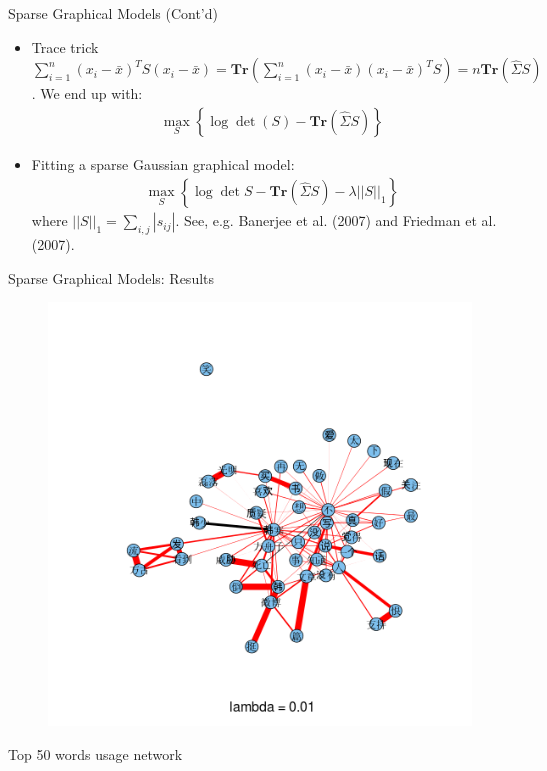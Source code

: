 \documentclass[12pt]{beamer}
\newcommand{\1}[1]{{\mathbf 1}\left\{#1\right\}}        %
\def\lp{\left(}
\def\rp{\right)}
\begin{document}
\begin{frame}[fragile]{Sparse Graphical Models (Cont'd)}

\begin{itemize}[<+->]
\item  Trace trick $\sum_{i=1}^n(x_i-\bar{x})^T S (x_i-\bar{x}) = \textbf{Tr} (\sum_{i=1}^n (x_i-\bar{x})(x_i-\bar{x})^TS) = n\textbf{Tr}(\hat{\Sigma}S)$. We end up with:
\begin{align*}
\max_S \left\{  \log \det \lp S\rp - \textbf{Tr}(\hat{\Sigma}S )  \right\}
\end{align*}

\item  Fitting a sparse Gaussian graphical model:
\begin{align*}
\max_S \left\{ \log \det S - \textbf{Tr} ( \hat{\Sigma}S ) - \lambda ||S||_1 \right\}
\end{align*}
where $||S||_1 = \sum_{i,j}|s_{ij}|$. See, e.g. Banerjee et al. (2007) and Friedman et al. (2007). 

\end{itemize}

\end{frame}

\begin{frame}{Sparse Graphical Models: Results}

\begin{figure}
  \centering
  \includegraphics[height=0.9\textheight]{./../../gLassoResults/glasso1.png} 
\end{figure}
\center Top 50 words usage network
\end{frame}
\end{document}

